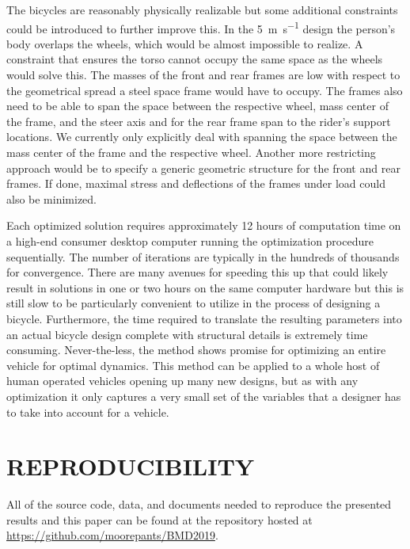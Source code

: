 \documentclass{bmd2019p}
\begin{document}
The bicycles are reasonably physically realizable but some additional
constraints could be introduced to further improve this. In the
5~\si{\meter\per\second} design the person's body overlaps the wheels, which
would be almost impossible to realize. A constraint that ensures the torso
cannot occupy the same space as the wheels would solve this. The masses of the
front and rear frames are low with respect to the geometrical spread a steel
space frame would have to occupy. The frames also need to be able to span the
space between the respective wheel, mass center of the frame, and the steer
axis and for the rear frame span to the rider's support locations. We currently
only explicitly deal with spanning the space between the mass center of the
frame and the respective wheel. Another more restricting approach would be to
specify a generic geometric structure for the front and rear frames. If done,
maximal stress and deflections of the frames under load could also be
minimized.

Each optimized solution requires approximately 12 hours of computation time on
a high-end consumer desktop computer running the optimization procedure
sequentially. The number of iterations are typically in the hundreds of
thousands for convergence. There are many avenues for speeding this up that
could likely result in solutions in one or two hours on the same computer
hardware but this is still slow to be particularly convenient to utilize in the
process of designing a bicycle. Furthermore, the time required to translate the
resulting parameters into an actual bicycle design complete with structural
details is extremely time consuming.  Never-the-less, the method shows promise
for optimizing an entire vehicle for optimal dynamics. This method can be
applied to a whole host of human operated vehicles opening up many new designs,
but as with any optimization it only captures a very small set of the variables
that a designer has to take into account for a vehicle.

\section{REPRODUCIBILITY}
%
All of the source code, data, and documents needed to reproduce the presented
results and this paper can be found at the repository hosted at
\url{https://github.com/moorepants/BMD2019}.



\end{document}
